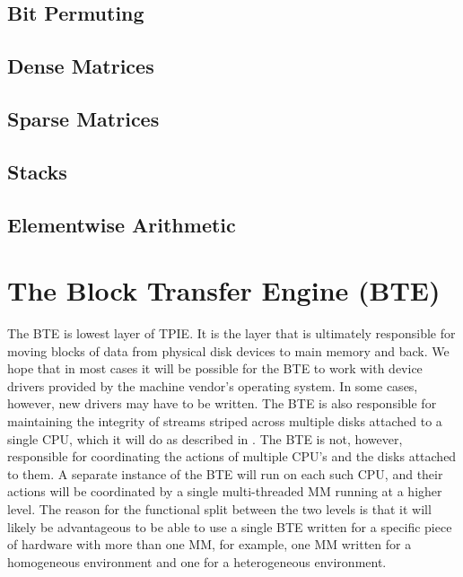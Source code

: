 
\subsection{Bit Permuting}
\label{sec:ref-imp-ami-bp}


\subsection{Dense Matrices}
\label{sec:ref-imp-ami-matrix}


\subsection{Sparse Matrices}
\label{sec:ref-imp-ami-sm}


\subsection{Stacks}
\label{sec:ref-imp-ami-stack}


\subsection{Elementwise Arithmetic}
\label{sec:ref-imp-ami-arith}


\section{The Block Transfer Engine (BTE)}
\label{sec:ref-bte}

The BTE is lowest layer of TPIE.  It is the layer that is ultimately
responsible for moving blocks of data from physical disk devices to main
memory and back.  We hope that in most cases it will be possible for the
BTE to work with device drivers provided by the machine vendor's operating
system.  In some cases, however, new drivers may have to be written.  The
BTE is also responsible for maintaining the integrity of streams striped
across multiple disks attached to a single CPU, which it will do as
described in \cite{vitter:parmem1}.  The BTE is not, however, responsible
for coordinating the actions of multiple CPU's and the disks attached to
them.  A separate instance of the BTE will run on each such CPU, and their
actions will be coordinated by a single multi-threaded MM running at a
higher level.  The reason for the functional split between the two levels
is that it will likely be advantageous to be able to use a single BTE
written for a specific piece of hardware with more than one MM, for
example, one MM written for a homogeneous environment and one for a
heterogeneous environment.

